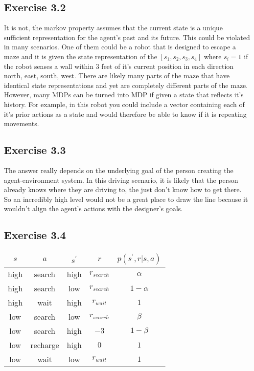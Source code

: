\subsection{Exercise 3.2}
It is not, the markov property assumes that the current state is a unique sufficient representation for the agent's past and its future. This could be violated in many scenarios. One of them could be a robot that is designed to escape a maze and it is given the state representation of the $[s_1,s_2,s_3,s_4]$ where $s_i = 1$ if the robot senses a wall within 3 feet of it's current position in each direction north, east, south, west. There are likely many parts of the maze that have identical state representations and yet are completely different parts of the maze. However, many MDPs can be turned into MDP if given a state that reflects it's history. For example, in this robot you could include a vector containing each of it's prior actions as a state and would therefore be able to know if it is repeating movements.

\subsection{Exercise 3.3}
The answer really depends on the underlying goal of the person creating the agent-environment system. In this driving scenario, it is likely that the person already knows where they are driving to, the just don't know how to get there. So an incredibly high level would not be a great place to draw the line because it wouldn't align the agent's actions with the designer's goals. 

\subsection{Exercise 3.4}

\begin{tabular}{ |c| c| c| c| c|}
  \hline
$s$ & $a$ & $s^\prime$ & $r$ & $p(s^\prime,r|s,a)$ \\
\hline
high & search & high & $r_{search}$ & $\alpha$ \\
high & search & low & $r_{search}$ & $1-\alpha$ \\
high & wait & high & $r_{wait}$ & $1$ \\
low & search & low & $r_{search}$ & $\beta$ \\
low & search & high & $-3$ & $1-\beta$ \\
low & recharge & high & $0$ & $1$ \\
low & wait & low & $r_{wait}$ & $1$ \\
\hline
\end{tabular}

